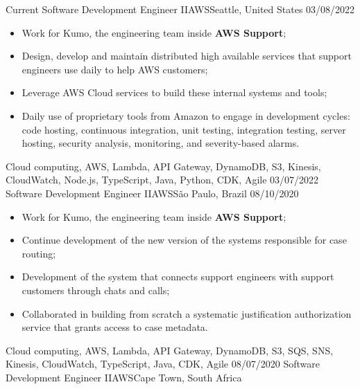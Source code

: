 %
%
%

\begin{experiences}
  \experience
    {Current}   {Software Development Engineer II}{AWS}{Seattle, United States}
    {03/08/2022} {
    \begin{itemize}
      \item Work for Kumo, the engineering team inside \textbf{AWS Support};
      \item Design, develop and maintain distributed high available services that support engineers use daily to help AWS customers;
      \item Leverage AWS Cloud services to build these internal systems and tools;
      \item Daily use of proprietary tools from Amazon to engage in development cycles: code hosting, continuous integration, unit testing, integration testing, server hosting, security analysis, monitoring, and severity-based alarms.
    \end{itemize}
  }
  {Cloud computing, AWS, Lambda, API Gateway, DynamoDB, S3, Kinesis, CloudWatch, Node.js, TypeScript, Java, Python, CDK, Agile }
  \emptySeparator
  \experience
    {03/07/2022}   {Software Development Engineer II}{AWS}{São Paulo, Brazil}
    {08/10/2020} {
    \begin{itemize}
      \item Work for Kumo, the engineering team inside \textbf{AWS Support};
      \item Continue development of the new version of the systems responsible for case routing;
      \item Development of the system that connects support engineers with support customers through chats and calls;
      \item Collaborated in building from scratch a systematic justification authorization service that grants access to case metadata.
    \end{itemize}
  }
  {Cloud computing, AWS, Lambda, API Gateway, DynamoDB, S3, SQS, SNS, Kinesis, CloudWatch, TypeScript, Java, CDK, Agile }
  \emptySeparator
  \experience
    {08/07/2020}   {Software Development Engineer II}{AWS}{Cape Town, South Africa}

\end{experiences}
